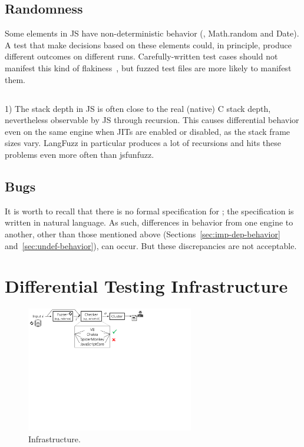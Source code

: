 \documentclass[10pt,conference,anonymous]{IEEEtran}
\begin{document}
\subsection{Randomness}

\sloppy Some elements in JS have non-deterministic behavior (\eg{},
Math.random and Date). A test that make decisions based on these
elements could, in principle, produce different outcomes on different
runs. Carefully-written test cases should not manifest this kind of
flakiness~\cite{luo-etal-fse2014,palomba-zaidman-icsme2017}, but
fuzzed test files are more likely to manifest them.

\subsection{}

1) The stack depth in JS is often close to the real (native) C stack
depth, nevertheless observable by JS through recursion. This causes
differential behavior even on the same engine when JITs are enabled or
disabled, as the stack frame sizes vary. LangFuzz in particular
produces a lot of recursions and hits these problems even more often
than jsfunfuzz.

\subsection{Bugs}

It is worth to recall that there is no formal specification for \es{};
the specification is written in natural language. As such, differences
in behavior from one engine to another, other than those mentioned
above (Sections~\ref{sec:imp-dep-behavior}
and~\ref{sec:undef-behavior}), can occur. But these discrepancies are
not acceptable.


\section{Differential Testing Infrastructure}
\label{sec:design}


\begin{figure}[t]
  \centering
  \includegraphics[trim=0 350 0 0,clip,width=0.65\textwidth]{diff-testing-runtimes}
  \caption{\label{fig:workflow}Infrastructure.}
\end{figure}
\end{document}
